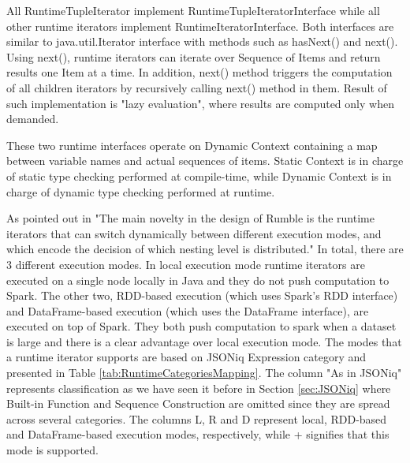 All RuntimeTupleIterator implement RuntimeTupleIteratorInterface while all other runtime iterators implement RuntimeIteratorInterface. Both interfaces are similar to java.util.Iterator interface with methods such as hasNext() and next(). Using next(), runtime iterators can iterate over Sequence of Items and return results one Item at a time. In addition, next() method triggers the computation of all children iterators by recursively calling next() method in them. Result of such implementation is "lazy evaluation", where results are computed only when demanded. 

These two runtime interfaces operate on Dynamic Context containing a map between variable names and actual sequences of items. Static Context is in charge of static type checking performed at compile-time, while Dynamic Context is in charge of dynamic type checking performed at runtime.

As pointed out in \cite{RumblePaper} "The main novelty in the design of Rumble is the runtime iterators that can switch dynamically between different execution modes, and which encode the decision of which nesting level is distributed." In total, there are 3 different execution modes. In local execution mode runtime iterators are executed on a single node locally in Java and they do not push computation to Spark. The other two, RDD-based execution (which uses Spark’s RDD interface) and  DataFrame-based execution (which uses the DataFrame interface), are executed on top of Spark. They both push computation to spark when a dataset is large and there is a clear advantage over local execution mode. The modes that a runtime iterator supports are based on JSONiq Expression category and presented in Table \ref{tab:RuntimeCategoriesMapping}. The column "As in JSONiq" represents classification as we have seen it before in Section \ref{sec:JSONiq} where Built-in Function and Sequence Construction are omitted since they are spread across several categories. The columns L, R and D represent local, RDD-based and DataFrame-based execution modes, respectively, while + signifies that this mode is supported.

